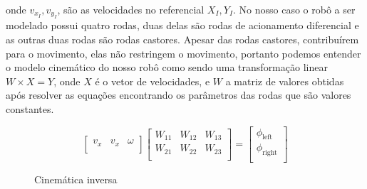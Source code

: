 onde $v_{x_I}, v_{y_I}$, são as velocidades no referencial $X_I,Y_I$.
No nosso caso o robô a ser modelado possui quatro rodas, duas delas são
rodas de acionamento diferencial e as outras duas rodas são rodas castores.
Apesar das rodas castores, contribuírem para o movimento, elas não restringem
o movimento, portanto podemos entender o modelo cinemático do nosso robô
como sendo uma transformação linear $W \times X = Y$, onde $X$ é o vetor
de velocidades, e $W$ a matriz de valores obtidas após resolver as equações
encontrando os parâmetros das rodas que são valores constantes.
% 
\begin{figure}[H]
    \[
        \begin{bmatrix}
            v_x & v_x & \omega \\
        \end{bmatrix}
    \begin{bmatrix}
        W_{11} &  W_{12} & W_{13} \\
        W_{21} &  W_{22} & W_{23} \\
    \end{bmatrix}
    =
    \begin{bmatrix}
        \phi_{\text{left}} \\
        \phi_{\text{right}} \\
    \end{bmatrix}
\]
    \caption{Cinemática inversa}
\end{figure}


